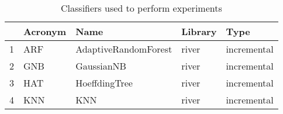 \begin{table}
\footnotesize
\caption{Classifiers used to perform experiments}
\label{tab:algorithm}
\begin{tabular}{lllll}
\hline
 & Acronym & Name & Library & Type \\
\hline
1 & ARF & AdaptiveRandomForest & river & incremental \\
2 & GNB & GaussianNB & river & incremental \\
3 & HAT & HoeffdingTree & river & incremental \\
4 & KNN & KNN & river & incremental \\
\hline
\end{tabular}
\end{table}
